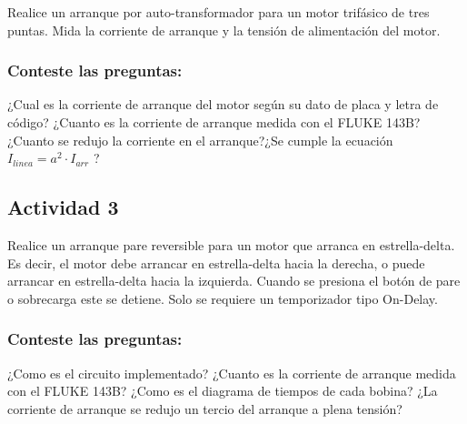  Realice un arranque por auto-transformador para un motor trifásico de tres puntas. Mida la corriente de arranque  y la tensión de alimentación del motor.
 
 
\subsubsection{Conteste las preguntas:}

¿Cual es la corriente de arranque del motor según su dato de placa y letra de código? ¿Cuanto es la corriente de arranque medida con el FLUKE 143B? ¿Cuanto se redujo la corriente en el arranque?¿Se cumple la ecuación $I_{linea} = a^{2}\cdot I_{arr}$ ?

\subsection{Actividad 3}

Realice un arranque pare reversible para un motor que arranca en estrella-delta. Es decir, el motor debe arrancar en estrella-delta hacia la derecha, o puede arrancar en estrella-delta hacia la izquierda. Cuando se presiona el botón de pare o sobrecarga este se detiene. Solo se requiere un temporizador tipo On-Delay.

\subsubsection{Conteste las preguntas:} 

 ¿Como es el circuito implementado? ¿Cuanto es la corriente de arranque medida con el FLUKE 143B? ¿Como es el diagrama de tiempos de cada bobina? ¿La corriente de arranque se redujo un tercio del arranque a plena tensión? 



